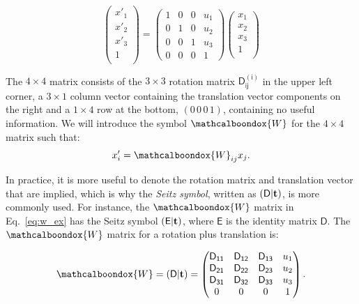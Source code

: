 \begin{equation}
\begin{pmatrix}
x'_1\\
x'_2\\
x'_3\\
1\\
\end{pmatrix}
=
\begin{pmatrix}
1 & 0 & 0 & u_1 \\
0 & 1 & 0 & u_2 \\
0 & 0 & 1 & u_3 \\
0 & 0 & 0 & 1
\end{pmatrix}
\begin{pmatrix}
x_1\\
x_2\\
x_3\\
1\\
\end{pmatrix}
\label{eq:w_ex}
\end{equation}

The $4\times4$ matrix consists of the $3\times3$ rotation matrix $\mathsf{D^{(i)}_{ij}}$ in the upper left corner, a $3\times1$ column vector containing the translation vector components on the right and a $1\times4$ row at the bottom, $(0 \, 0\, 0\, 1)$, containing no useful information. We will introduce the symbol $\mathcalboondox{W}$ for the $4\times4$ matrix such that: 
\begin{equation*}
x'_i=\mathcalboondox{W}_{ij} x_j.
\end{equation*}

\label{eq:Seitz}
In practice, it is more useful to denote the rotation matrix and translation vector that are implied, which is why the \textit{Seitz symbol}, written as $(\mathsf{D} |\vb{t})$, is more commonly used. For instance, the $\mathcalboondox{W}$ matrix in Eq.~\ref{eq:w_ex} has the Seitz symbol $(\mathsf{E} |\vb{t})$, where $\mathsf{E}$ is the identity matrix $\mathsf{D}$. The $\mathcalboondox{W}$ matrix for a rotation plus translation is:

\begin{equation}
\label{eq:Wdef}
\mathcalboondox{W} = (\mathsf{D} |\vb{t}) = 
\begin{pmatrix}
\mathsf{D_{11}} & \mathsf{D_{12}} & \mathsf{D_{13}} & u_1 \\
\mathsf{D_{21}} & \mathsf{D_{22}} & \mathsf{D_{23}} & u_2 \\
\mathsf{D_{31}} & \mathsf{D_{32}} & \mathsf{D_{33}} & u_3 \\
0 & 0 & 0 & 1 \\
\end{pmatrix}.
\end{equation}
   
